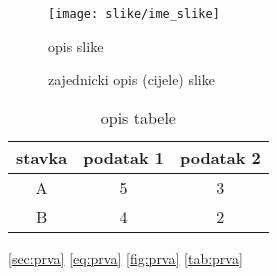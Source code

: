 

\begin{figure}[!htbp]
	\begin{center}
 \texttt{[image: slike/ime\_slike]}
 \caption{opis slike}
 \label{fig:ID_slike}
	\end{center}
\end{figure}


\begin{figure}[!htpb]
	  \begin{center}
\caption{zajednicki opis (cijele) slike}
\label{fig:ID_slike}
	  \end{center}
\end{figure}


	\renewcommand{\arraystretch}{1.2}  %
\begin{table}[!htbp]
\caption{opis tabele}
\centering
\begin{tabular}{|c|c|c|}
stavka & podatak 1 & podatak 2 \\ [0.5ex]  %
\hline \hline
A & 5 & 3 \\ [0.5ex]
B & 4 & 2 \\ [0.5ex]
\end{tabular}
\label{tab:ID_tabele}
\end{table}


\cite{joler:2010}	%

\ref{sec:prva}  %
\ref{eq:prva}		%
\ref{fig:prva}	%
\ref{tab:prva}	%


